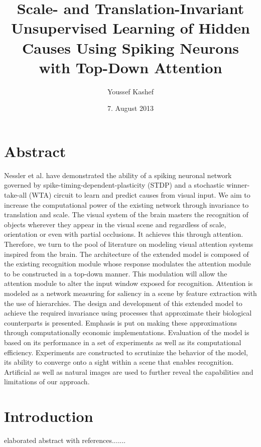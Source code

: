 \documentclass{report}
\begin{document}
\title{Scale- and Translation-Invariant Unsupervised Learning of Hidden Causes Using Spiking Neurons with Top-Down Attention}
\author{Youssef Kashef}
\date{7. August 2013}
\maketitle
\tableofcontents

\chapter{Abstract}

Nessler et al. have demonstrated the ability of a spiking neuronal network governed by spike-timing-dependent-plasticity (STDP) and a stochastic winner-take-all (WTA) circuit to learn and predict causes from visual input. We aim to increase the computational power of the existing network through invariance to translation and scale. The visual system of the brain masters the recognition of objects wherever they appear in the visual scene and regardless of scale, orientation or even with partial occlusions. It achieves this through attention. Therefore, we turn to the pool of literature on modeling visual attention systems inspired from the brain. The architecture of the extended model is composed of the existing recognition module whose response modulates the attention module to be constructed in a top-down manner. This modulation will allow the attention module to alter the input window exposed for recognition. Attention is modeled as a network measuring for saliency in a scene by feature extraction with the use of hierarchies. The design and development of this extended model to achieve the required invariance using processes that approximate their biological counterparts is presented. Emphasis is put on making these approximations through computationally economic implementations. Evaluation of the model is based on its performance in a set of experiments as well as its computational efficiency. Experiments are constructed to scrutinize the behavior of the model, its ability to converge onto a sight within a scene that enables recognition. Artificial as well as natural images are used to further reveal the capabilities and limitations of our approach.

\chapter{Introduction}

elaborated abstract with references.......\cite{Nessler2010}
\end{document}
